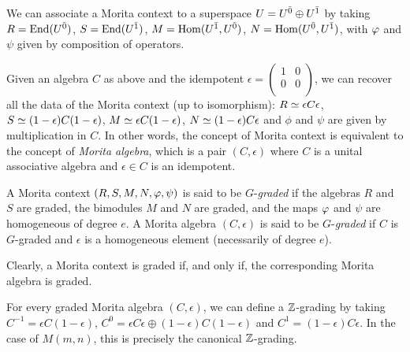 We can associate a Morita context to a superspace $U = U^{\bar0} \oplus U^{\bar1}$ by taking $R = \operatorname{End}(U^{\bar0})$, $S = \operatorname{End}(U^{\bar1})$, $M = \operatorname{Hom}(U^{\bar1}, U^{\bar0})$, 
$N = \operatorname{Hom} (U^{\bar0}, U^{\bar1})$, with $\varphi$ and $\psi$ given by composition of operators.

Given an algebra $C$ as above and the idempotent 
$
\epsilon = \left(\begin{matrix}
1  &  0\\
0   &  0\\
\end{matrix}
\right)
$, 
we can recover all the data of the Morita context (up to isomorphism): $R \simeq \epsilon C \epsilon$, $S \simeq (1 - \epsilon) C (1 - \epsilon)$, $M \simeq \epsilon C (1-\epsilon)$, $N \simeq (1-\epsilon) C \epsilon$ and $\phi$ and $\psi$ are given by multiplication in $C$. In other words, the concept of Morita context is equivalent to the concept of \emph{Morita algebra}, which is a pair $(C,\epsilon)$ where $C$ is a unital associative algebra and $\epsilon\in C$ is an idempotent. 

\begin{defi}
	A Morita context $(R, S, M, N, \varphi, \psi )$ is said to be $G$-\emph{graded} if the algebras $R$ and $S$ are graded, the bimodules $M$ and $N$ are graded, and the maps $\varphi$ and $\psi$ are homogeneous of degree $e$. A Morita algebra $(C,\epsilon)$ is said to be $G$-\emph{graded} if $C$ is $G$-graded and $\epsilon$ is a homogeneous element (necessarily of degree $e$).
\end{defi}

Clearly, a Morita context is graded if, and only if, the corresponding Morita algebra is graded.

\begin{remark}\label{remarkk}
For every graded Morita algebra $(C,\epsilon)$, we can define a $\mathbb{Z}$-grading by taking $C^{-1} = \epsilon C (1-\epsilon )$, $C^0 = \epsilon C \epsilon \oplus (1-\epsilon)C(1-\epsilon)$ and $C^1=(1-\epsilon)C\epsilon$. In the case of $M(m,n)$, this is precisely the canonical $\mathbb{Z}$-grading.
\end{remark}

